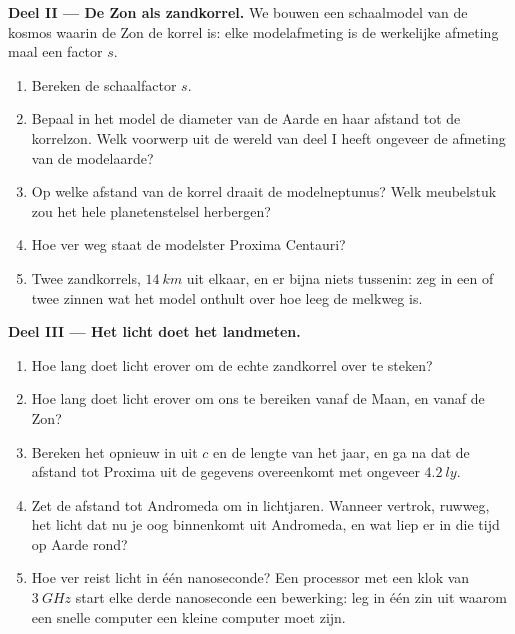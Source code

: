 \begin{problem}
\medskip
\noindent\textbf{Deel II --- De Zon als zandkorrel.}
We bouwen een schaalmodel van de kosmos waarin de Zon de korrel is:
elke modelafmeting is de werkelijke afmeting maal een factor $s$.
\begin{enumerate}[resume]
  \item Bereken de schaalfactor $s$.
  \item Bepaal in het model de diameter van de Aarde en haar afstand
        tot de korrelzon. Welk voorwerp uit de wereld van deel I heeft
        ongeveer de afmeting van de modelaarde?
  \item Op welke afstand van de korrel draait de modelneptunus? Welk
        meubelstuk zou het hele planetenstelsel herbergen?
  \item Hoe ver weg staat de modelster Proxima Centauri?
  \item Twee zandkorrels, $\qty{14}{km}$ uit elkaar, en er bijna niets
        tussenin: zeg in een of twee zinnen wat het model onthult over
        hoe leeg de melkweg is.
\end{enumerate}

\medskip
\noindent\textbf{Deel III --- Het licht doet het landmeten.}
\begin{enumerate}[resume]
  \item Hoe lang doet licht erover om de echte zandkorrel over te
        steken?
  \item Hoe lang doet licht erover om ons te bereiken vanaf de Maan, en
        vanaf de Zon?
  \item Bereken het  opnieuw in  uit $c$ en de lengte
        van het jaar, en ga na dat de afstand tot Proxima uit de
        gegevens overeenkomt met ongeveer $\qty{4.2}{ly}$.
  \item Zet de afstand tot Andromeda om in lichtjaren. Wanneer
        vertrok, ruwweg, het licht dat nu je oog binnenkomt uit
        Andromeda, en wat liep er in die tijd op Aarde rond?
  \item Hoe ver reist licht in één nanoseconde? Een processor met een
        klok van $\qty{3}{GHz}$ start elke derde nanoseconde een
        bewerking: leg in één zin uit waarom een snelle computer een
        kleine computer moet zijn.
\end{enumerate}


\end{problem}
